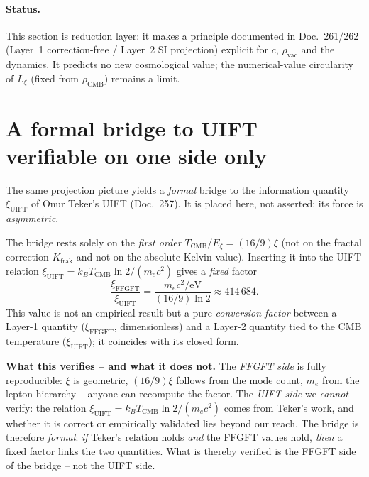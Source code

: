\paragraph{Status.} This section is reduction layer: it makes a principle
documented in Doc.~261/262 (Layer~1 correction-free / Layer~2 SI projection)
explicit for $c$, $\rho_{\text{vac}}$ and the dynamics. It predicts no new
cosmological value; the numerical-value circularity of $L_\xi$ (fixed from
$\rho_{\text{CMB}}$) remains a limit.

\section{A formal bridge to UIFT -- verifiable on one side only}

The same projection picture yields a \emph{formal} bridge to the information
quantity $\xi_{\text{UIFT}}$ of Onur Teker's UIFT (Doc.~257). It is placed here,
not asserted: its force is \emph{asymmetric}.

The bridge rests solely on the \emph{first order} $T_{\text{CMB}}/E_\xi =
(16/9)\xi$ (not on the fractal correction $K_{\text{frak}}$ and not on the
absolute Kelvin value). Inserting it into the UIFT relation
$\xi_{\text{UIFT}} = k_B T_{\text{CMB}}\ln 2/(m_e c^2)$ gives a \emph{fixed}
factor
\[
  \frac{\xi_{\text{FFGFT}}}{\xi_{\text{UIFT}}}
  = \frac{m_e c^2/\text{eV}}{(16/9)\ln 2} \approx 414\,684 .
\]
This value is not an empirical result but a pure \emph{conversion factor}
between a Layer-1 quantity ($\xi_{\text{FFGFT}}$, dimensionless) and a
Layer-2 quantity tied to the CMB temperature ($\xi_{\text{UIFT}}$); it
coincides with its closed form.

\textbf{What this verifies -- and what it does not.} The \emph{FFGFT side} is
fully reproducible: $\xi$ is geometric, $(16/9)\xi$ follows from the mode count,
$m_e$ from the lepton hierarchy -- anyone can recompute the factor. The
\emph{UIFT side} we \emph{cannot} verify: the relation
$\xi_{\text{UIFT}}=k_B T_{\text{CMB}}\ln 2/(m_e c^2)$ comes from Teker's work,
and whether it is correct or empirically validated lies beyond our reach. The
bridge is therefore \emph{formal}: \emph{if} Teker's relation holds \emph{and}
the FFGFT values hold, \emph{then} a fixed factor links the two quantities.
What is thereby verified is the FFGFT side of the bridge -- not the UIFT side.

